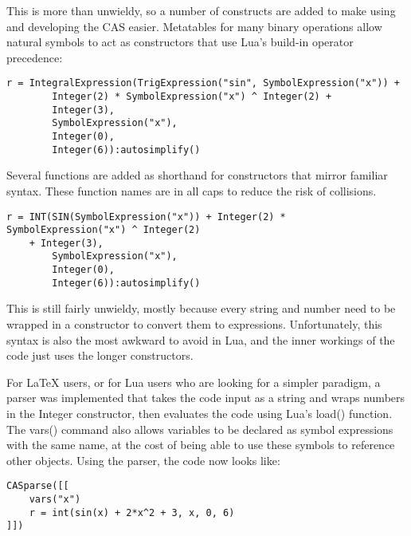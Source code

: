 \documentclass{article}
\begin{document}
This is more than unwieldy, so a number of constructs are added to make using and developing the CAS easier. Metatables for many binary operations allow natural symbols to act as constructors that use Lua's build-in operator precedence:

\begin{verbatim}
r = IntegralExpression(TrigExpression("sin", SymbolExpression("x")) +
        Integer(2) * SymbolExpression("x") ^ Integer(2) +
        Integer(3),
        SymbolExpression("x"),
        Integer(0),
        Integer(6)):autosimplify()
\end{verbatim}

Several functions are added as shorthand for constructors that mirror familiar syntax. These function names are in all caps to reduce the risk of collisions.

\begin{verbatim}
r = INT(SIN(SymbolExpression("x")) + Integer(2) * SymbolExpression("x") ^ Integer(2) 
    + Integer(3),
        SymbolExpression("x"),
        Integer(0),
        Integer(6)):autosimplify()
\end{verbatim}

This is still fairly unwieldy, mostly because every string and number need to be wrapped in a constructor to convert them to expressions. Unfortunately, this syntax is also the most awkward to avoid in Lua, and the inner workings of the code just uses the longer constructors.

For \LaTeX{} users, or for Lua users who are looking for a simpler paradigm, a parser was implemented that takes the code input as a string and wraps numbers in the {\ttfamily Integer} constructor, then evaluates the code using Lua's {\ttfamily load()} function. The {\ttfamily vars()} command also allows variables to be declared as symbol expressions with the same name, at the cost of being able to use these symbols to reference other objects. Using the parser, the code now looks like:

\begin{verbatim}
CASparse([[
    vars("x")
    r = int(sin(x) + 2*x^2 + 3, x, 0, 6)
]])
\end{verbatim}

\newpage

\printbibliography
\end{document}
